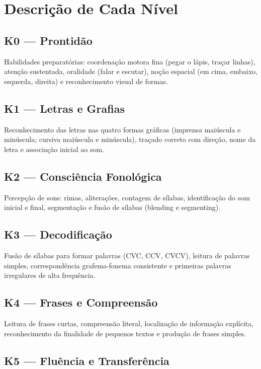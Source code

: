 \niveisK

\section{Descrição de Cada Nível}

\subsection{K0 --- Prontidão}

Habilidades preparatórias: coordenação motora fina (pegar o lápis, traçar linhas), atenção sustentada, oralidade (falar e escutar), noção espacial (em cima, embaixo, esquerda, direita) e reconhecimento visual de formas.

\subsection{K1 --- Letras e Grafias}

Reconhecimento das letras nas quatro formas gráficas (imprensa maiúscula e minúscula; cursiva maiúscula e minúscula), traçado correto com direção, nome da letra e associação inicial ao som.

\subsection{K2 --- Consciência Fonológica}

Percepção de sons: rimas, aliterações, contagem de sílabas, identificação do som inicial e final, segmentação e fusão de sílabas (blending e segmenting).

\subsection{K3 --- Decodificação}

Fusão de sílabas para formar palavras (CVC, CCV, CVCV), leitura de palavras simples, correspondência grafema-fonema consistente e primeiras palavras irregulares de alta frequência.

\subsection{K4 --- Frases e Compreensão}

Leitura de frases curtas, compreensão literal, localização de informação explícita, reconhecimento da finalidade de pequenos textos e produção de frases simples.

\subsection{K5 --- Fluência e Transferência}

